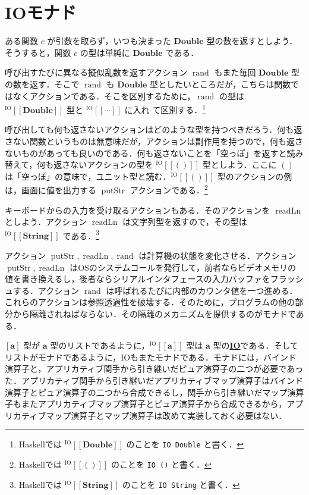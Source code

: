 \documentclass[a5paper,twoside,fleqn,draft]{jsbook}
\def\[{[\![}
\def\]{]\!]}
\newcommand{\programminglanguage}[1]{\textsf{#1}}
\newcommand{\haskell}{\programminglanguage{Haskell}}
\newcommand{\keyword}[1]{{\underline{\textbf{#1}}}}
\newcommand{\code}[1]{\texttt{#1}}
\newcommand{\mAction}[1]{\mathrm{#1}}
\DeclareMathOperator{\mReadLn}{\mAction{readLn}}
\DeclareMathOperator{\mPutStr}{\mAction{putStr}}
\DeclareMathOperator{\mRand}{\mAction{rand}}
\newcommand{\mType}[1]{\mathbf{#1}} %
\newcommand{\mA}{\mType{a}}
\newcommand{\mDoubleType}{\mType{Double}}
\newcommand{\mStringType}{\mType{String}}
\newcommand{\mUnitType}{\mType{()}}
\newcommand{\mTypeAssemble}[2]{{}^\mathrm{#1}\[\mType{#2}\]}
\newcommand{\mIOType}[1]{\mTypeAssemble{IO}{#1}}
\newcommand{\mIODoubleType}{\mIOType{\mDoubleType}}
\newcommand{\mIOStringType}{\mIOType{\mStringType}}
\newcommand{\mIOUnitType}{\mIOType{\mUnitType}}
\begin{document}
\section{IOモナド}

ある関数 $c$ が引数を取らず，いつも決まった $\mDoubleType$ 型の数を返すとしよう．そうすると，関数 $c$ の型は単純に $\mDoubleType$ である．

呼び出すたびに異なる擬似乱数を返すアクション $\mRand$ もまた毎回 $\mDoubleType$ 型の数を返す．そこで $\mRand$ も $\mDoubleType$ 型としたいところだが，こちらは関数ではなくアクションである．そこを区別するために，$\mRand$ の型は $\mIODoubleType$ 型と $\mIOType{\dotsb}$ に入れ
て区別する．\footnote{\haskell では $\mIODoubleType$ のことを \code{IO Double} と書く．}

呼び出しても何も返さないアクションはどのような型を持つべきだろう．何も返さない関数というものは無意味だが，アクションは副作用を持つので，何も返さないものがあっても良いのである．何も返さないことを「空っぽ」を返すと読み替えて，何も返さないアクションの型を $\mIOUnitType$ 型としよう．ここに $\mUnitType$ は「空っぽ」の意味で，ユニット型と読む．$\mIOUnitType$ 型のアクションの例は，画面に値を出力する $\mPutStr$ アクションである．\footnote{\haskell では $\mIOUnitType$ のことを \code{IO ()} と書く．}

キーボードからの入力を受け取るアクションもある．そのアクションを $\mReadLn$ としよう．アクション $\mReadLn$ は文字列型を返すので，その型は $\mIOStringType$ である．\footnote{\haskell では $\mIOStringType$ のことを \code{IO String} と書く．}

アクション $\mPutStr,\mReadLn,\mRand$ は計算機の状態を変化させる．アクション $\mPutStr,\mReadLn$ はOSのシステムコールを発行して，前者ならビデオメモリの値を書き換えるし，後者ならシリアルインタフェースの入力バッファをフラッシュする．アクション $\mRand$ は呼ばれるたびに内部のカウンタ値を一つ進める．これらのアクションは参照透過性を破壊する．そのために，プログラムの他の部分から隔離されねばならない．その隔離のメカニズムを提供するのがモナドである．

$[\mA]$ 型が $\mA $ 型のリストであるように，$\mIOType{a}$ 型は $\mA $ 型の\keyword{IO}である．そしてリストがモナドであるように，IOもまたモナドである．モナドには，バインド演算子と，アプリカティブ関手から引き継いだピュア演算子の二つが必要であった．アプリカティブ関手から引き継いだアプリカティブマップ演算子はバインド演算子とピュア演算子の二つから合成できるし，関手から引き継いだマップ演算子もまたアプリカティブマップ演算子とピュア演算子から合成できるから，アプリカティブマップ演算子とマップ演算子は改めて実装しておく必要はない．
\end{document}
